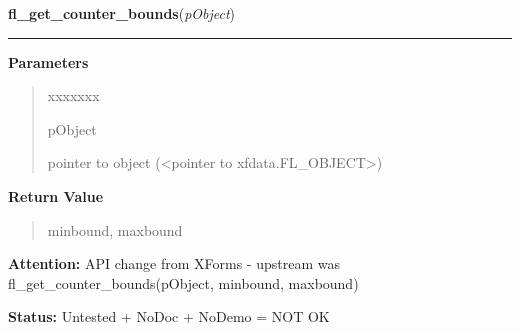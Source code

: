 \hspace{.8\funcindent}\begin{boxedminipage}{\funcwidth}

    \raggedright \textbf{fl\_get\_counter\_bounds}(\textit{pObject})

    \vspace{-1.5ex}

    \rule{\textwidth}{0.5\fboxrule}
\setlength{\parskip}{2ex}
\setlength{\parskip}{1ex}
      \textbf{Parameters}
      \vspace{-1ex}

      \begin{quote}
        \begin{Ventry}{xxxxxxx}

          \item[pObject]

          pointer to object ({\textless}pointer to 
          xfdata.FL\_OBJECT{\textgreater})

        \end{Ventry}

      \end{quote}

      \textbf{Return Value}
    \vspace{-1ex}

      \begin{quote}
      minbound, maxbound

      \end{quote}

\textbf{Attention:} API change from XForms - upstream was fl\_get\_counter\_bounds(pObject, 
minbound, maxbound)



\textbf{Status:} Untested + NoDoc + NoDemo = NOT OK



    \end{boxedminipage}

    \label{xformslib:library:fl_get_counter_step}

    \vspace{0.5ex}

